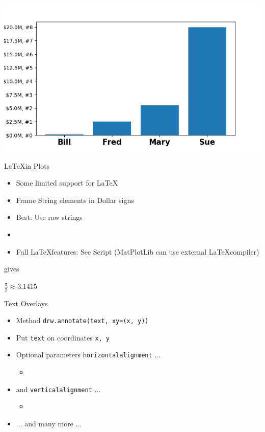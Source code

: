 \begin{frame}
%
\begin{tcolorbox}[title=Axis Labels]
\begin{center}
	\includegraphics[width=.8\linewidth]{./gfx/plt-TicksFormatter}
\end{center}
\end{tcolorbox}
%
\end{frame}


\begin{frame}{\LaTeX in Plots}
%
\begin{itemize}
\item Some limited support for \LaTeX
\item Frame String elements in Dollar signs
\item Best: Use raw strings
\item {}
\item Full \LaTeX features: See Script (MatPlotLib can use external \LaTeX compiler)
\end{itemize}
%
\begin{center}

gives

$\frac{\pi}{2} \approx 3.1415$
\end{center}
%
\end{frame}


\begin{frame}{Text Overlays}
%
\begin{itemize}
\item Method \texttt{drw.annotate(text, xy=(x, y))}
\item Put \texttt{text} on coordinates \texttt{x, y}
\item Optional parameters \texttt{horizontalalignment} ...
	\begin{itemize}
	\item {}
	\end{itemize}
\item and \texttt{verticalalignment} ...
	\begin{itemize}
	\item {}
	\end{itemize}
\item ... and many more ...
\end{itemize}
%
\end{frame}

